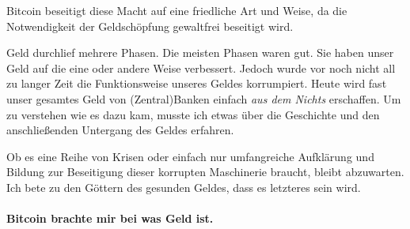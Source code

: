 Bitcoin beseitigt diese Macht auf eine friedliche Art und Weise, da die
Notwendigkeit der Geldschöpfung gewaltfrei beseitigt wird.

Geld durchlief mehrere Phasen. Die meisten Phasen waren gut. Sie haben unser
Geld auf die eine oder andere Weise verbessert. Jedoch wurde vor noch nicht all
zu langer Zeit die Funktionsweise unseres Geldes korrumpiert. Heute wird fast
unser gesamtes Geld von (Zentral)Banken einfach \textit{aus dem Nichts}
erschaffen. Um zu verstehen wie es dazu kam, musste ich etwas über die
Geschichte und den anschließenden Untergang des Geldes erfahren.

Ob es eine Reihe von Krisen oder einfach nur umfangreiche Aufklärung und Bildung
zur Beseitigung dieser korrupten Maschinerie braucht, bleibt abzuwarten. Ich
bete zu den Göttern des gesunden Geldes, dass es letzteres sein wird.

\paragraph{Bitcoin brachte mir bei was Geld ist.}

%
%
%
%
